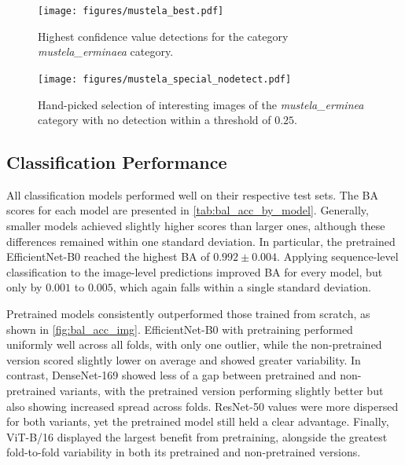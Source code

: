 

\begin{figure}[]
\centering
\texttt{[image: figures/mustela\_best.pdf]}
\caption{Highest confidence value detections for the category \textit{mustela\_erminaea} category.}
\label{fig:detection_mustela_best}
\end{figure}

\begin{figure}[]
\centering
\texttt{[image: figures/mustela\_special\_nodetect.pdf]}
\caption{Hand-picked selection of interesting images of the \textit{mustela\_erminea} category with no detection within a threshold of \(0.25\).}
\label{fig:detection_special_nodetect}
\end{figure}

\subsection{Classification Performance}
All classification models performed well on their respective test sets.
The \ac{BA} scores for each model are presented in \autoref{tab:bal_acc_by_model}.
Generally, smaller models achieved slightly higher scores than larger ones, although these differences remained within one standard deviation.
In particular, the pretrained EfficientNet-B0 reached the highest \ac{BA} of \(0.992\pm0.004\).
Applying sequence-level classification to the image-level predictions improved \ac{BA} for every model, but only by \(0.001\) to \(0.005\), which again falls within a single standard deviation.

Pretrained models consistently outperformed those trained from scratch, as shown in \autoref{fig:bal_acc_img}.
EfficientNet-B0 with pretraining performed uniformly well across all folds, with only one outlier, while the non-pretrained version scored slightly lower on average and showed greater variability.
In contrast, DenseNet-169 showed less of a gap between pretrained and non-pretrained variants, with the pretrained version performing slightly better but also showing increased spread across folds.
ResNet-50 values were more dispersed for both variants, yet the pretrained model still held a clear advantage.
Finally, ViT-B/16 displayed the largest benefit from pretraining, alongside the greatest fold-to-fold variability in both its pretrained and non-pretrained versions.



